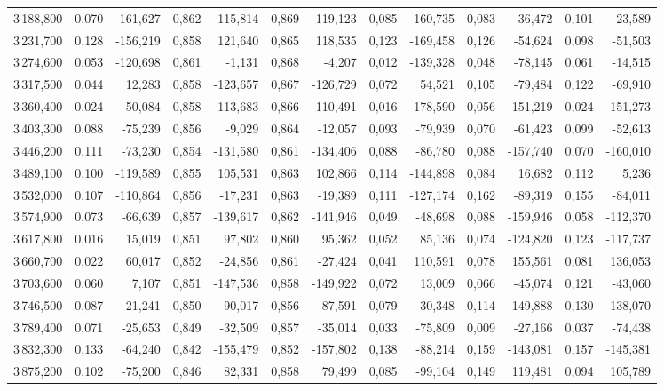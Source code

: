 \begin{longtable}{rrrrrrrrrrrrr}
3\,188,800 & 0,070 & -161,627 & 0,862 & -115,814 & 0,869 & -119,123 & 0,085 & 160,735 & 0,083 & 36,472 & 0,101 & 23,589\\
3\,231,700 & 0,128 & -156,219 & 0,858 & 121,640 & 0,865 & 118,535 & 0,123 & -169,458 & 0,126 & -54,624 & 0,098 & -51,503\\
3\,274,600 & 0,053 & -120,698 & 0,861 & -1,131 & 0,868 & -4,207 & 0,012 & -139,328 & 0,048 & -78,145 & 0,061 & -14,515\\
3\,317,500 & 0,044 & 12,283 & 0,858 & -123,657 & 0,867 & -126,729 & 0,072 & 54,521 & 0,105 & -79,484 & 0,122 & -69,910\\
3\,360,400 & 0,024 & -50,084 & 0,858 & 113,683 & 0,866 & 110,491 & 0,016 & 178,590 & 0,056 & -151,219 & 0,024 & -151,273\\
3\,403,300 & 0,088 & -75,239 & 0,856 & -9,029 & 0,864 & -12,057 & 0,093 & -79,939 & 0,070 & -61,423 & 0,099 & -52,613\\
3\,446,200 & 0,111 & -73,230 & 0,854 & -131,580 & 0,861 & -134,406 & 0,088 & -86,780 & 0,088 & -157,740 & 0,070 & -160,010\\
3\,489,100 & 0,100 & -119,589 & 0,855 & 105,531 & 0,863 & 102,866 & 0,114 & -144,898 & 0,084 & 16,682 & 0,112 & 5,236\\
3\,532,000 & 0,107 & -110,864 & 0,856 & -17,231 & 0,863 & -19,389 & 0,111 & -127,174 & 0,162 & -89,319 & 0,155 & -84,011\\
3\,574,900 & 0,073 & -66,639 & 0,857 & -139,617 & 0,862 & -141,946 & 0,049 & -48,698 & 0,088 & -159,946 & 0,058 & -112,370\\
3\,617,800 & 0,016 & 15,019 & 0,851 & 97,802 & 0,860 & 95,362 & 0,052 & 85,136 & 0,074 & -124,820 & 0,123 & -117,737\\
3\,660,700 & 0,022 & 60,017 & 0,852 & -24,856 & 0,861 & -27,424 & 0,041 & 110,591 & 0,078 & 155,561 & 0,081 & 136,053\\
3\,703,600 & 0,060 & 7,107 & 0,851 & -147,536 & 0,858 & -149,922 & 0,072 & 13,009 & 0,066 & -45,074 & 0,121 & -43,060\\
3\,746,500 & 0,087 & 21,241 & 0,850 & 90,017 & 0,856 & 87,591 & 0,079 & 30,348 & 0,114 & -149,888 & 0,130 & -138,070\\
3\,789,400 & 0,071 & -25,653 & 0,849 & -32,509 & 0,857 & -35,014 & 0,033 & -75,809 & 0,009 & -27,166 & 0,037 & -74,438\\
3\,832,300 & 0,133 & -64,240 & 0,842 & -155,479 & 0,852 & -157,802 & 0,138 & -88,214 & 0,159 & -143,081 & 0,157 & -145,381\\
3\,875,200 & 0,102 & -75,200 & 0,846 & 82,331 & 0,858 & 79,499 & 0,085 & -99,104 & 0,149 & 119,481 & 0,094 & 105,789\\

\end{longtable}
